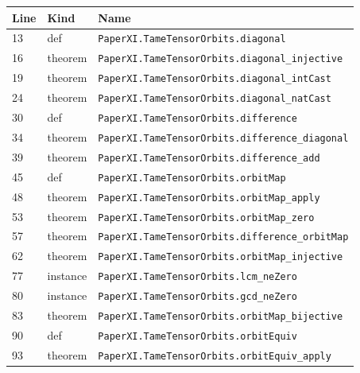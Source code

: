 \documentclass[10pt,oneside]{book}
\begin{document}
\begin{longtable}{@{}p{}p{}p{}@{}}\toprule Line&Kind&Name\\\midrule\endhead

13&def&\nolinkurl{PaperXI.TameTensorOrbits.diagonal}\\

16&theorem&\nolinkurl{PaperXI.TameTensorOrbits.diagonal_injective}\\

19&theorem&\nolinkurl{PaperXI.TameTensorOrbits.diagonal_intCast}\\

24&theorem&\nolinkurl{PaperXI.TameTensorOrbits.diagonal_natCast}\\

30&def&\nolinkurl{PaperXI.TameTensorOrbits.difference}\\

34&theorem&\nolinkurl{PaperXI.TameTensorOrbits.difference_diagonal}\\

39&theorem&\nolinkurl{PaperXI.TameTensorOrbits.difference_add}\\

45&def&\nolinkurl{PaperXI.TameTensorOrbits.orbitMap}\\

48&theorem&\nolinkurl{PaperXI.TameTensorOrbits.orbitMap_apply}\\

53&theorem&\nolinkurl{PaperXI.TameTensorOrbits.orbitMap_zero}\\

57&theorem&\nolinkurl{PaperXI.TameTensorOrbits.difference_orbitMap}\\

62&theorem&\nolinkurl{PaperXI.TameTensorOrbits.orbitMap_injective}\\

77&instance&\nolinkurl{PaperXI.TameTensorOrbits.lcm_neZero}\\

80&instance&\nolinkurl{PaperXI.TameTensorOrbits.gcd_neZero}\\

83&theorem&\nolinkurl{PaperXI.TameTensorOrbits.orbitMap_bijective}\\

90&def&\nolinkurl{PaperXI.TameTensorOrbits.orbitEquiv}\\

93&theorem&\nolinkurl{PaperXI.TameTensorOrbits.orbitEquiv_apply}\\


\end{longtable}
\end{document}
